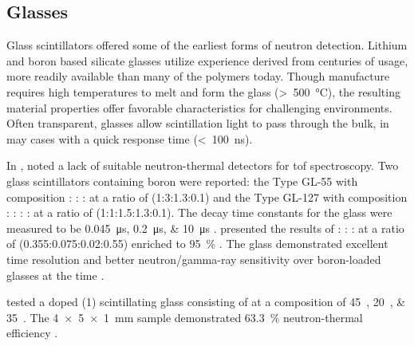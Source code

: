\documentclass[../../../main.tex]{subfiles}%
\begin{document}
%
    \subsection{Glasses}%
    \label{sec:chapter-2:scintillator-detectors:glass}%
    Glass scintillators offered some of the earliest forms of neutron detection.
    Lithium and boron based silicate glasses utilize experience derived from centuries of usage, more readily available than many of the polymers today.
    Though manufacture requires high temperatures to melt and form the glass (\SI{500}[>]{\celsius}), the resulting material properties offer favorable characteristics for challenging environments.
    Often transparent, glasses allow scintillation light to pass through the bulk, in may cases with a quick response time (\SI{100}[<]{\nano\second}).
    \par%
    In \citeyear*{Bollinger_1959}, \citeauthor*{Bollinger_1959} noted a lack of suitable \gls{neutron-thermal} detectors for \gls{tof} spectroscopy.
    Two glass scintillators containing boron were reported: the Type GL-55 with composition  :  :  :  at a ratio of (1:3:1.3:0.1) and the Type GL-127 with composition  :  :  :  :  at a ratio of (1:1:1.5:1.3:0.1).
    The decay time constants for the glass were measured to be \SIlist{0.045;0.2;10}{\micro\second} \citeyear*{Bollinger_1959}.
    \citeauthor*{Firk_1961} presented the results of  :  :  :  at a ratio of (0.355:0.075:0.02:0.55) enriched to \SI{95}{\percent} .
    The glass demonstrated excellent time resolution and better neutron/\gls{gamma-ray} sensitivity over boron-loaded glasses at the time \cite{Firk_1961}.
    \par%
    \citeauthor*{Katagiri_2004} tested a  doped (\SI{1}{\percentmole}) scintillating glass consisting of  at a composition of \SIlist{45;20;35}{\percentweight}.
    The \SI{4x5x1}{\milli\meter} sample demonstrated \SI{63.3}{\percent} \gls{neutron-thermal} efficiency \cite{Katagiri_2004}.   
\end{document}
